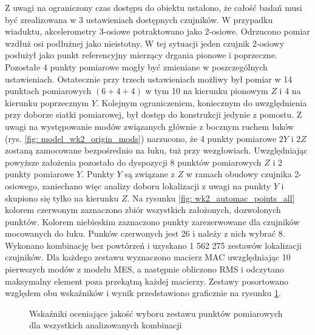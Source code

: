 Z uwagi na ograniczony czas dostępu do obiektu ustalono, że całość badań musi być zrealizowana w 3 ustawieniach dostępnych czujników. W przypadku wiaduktu, akcelerometry 3-osiowe potraktowano jako 2-osiowe. Odrzucono pomiar wzdłuż osi podłużnej jako nieistotny. W tej sytuacji jeden czujnik 2-osiowy posłużył jako punkt referencyjny mierzący drgania pionowe i poprzeczne. Pozostałe 4 punkty pomiarowe mogły być zmieniane w poszczególnych ustawieniach. Ostatecznie przy trzech ustawieniach możliwy był pomiar w 14 punktach pomiarowych $(6+4+4)$ w tym 10 na kierunku pionowym $Z$ i 4 na kierunku poprzecznym $Y$. Kolejnym ograniczeniem, koniecznym do uwzględnienia przy doborze siatki pomiarowej, był dostęp do konstrukcji jedynie z pomostu. Z uwagi na występowanie modów związanych głównie z bocznym ruchem łuków (rys. \ref{fig: model_wk2_origin_mods}) narzucono, że 4 punkty pomiarowe $2Y$ i $2Z$ zostaną zamocowane bezpośrednio na łuku, tuż przy wezgłowiach. Uwzględniając powyższe założenia pozostało do dyspozycji 8 punktów pomiarowych $Z$ i 2 punkty pomiarowe $Y$. Punkty $Y$ są związane z $Z$ w ramach obudowy czujnika 2-osiowego, zaniechano więc analizy doboru lokalizacji z uwagi na punkty $Y$ i skupiono się tylko na kierunku $Z$. Na rysunku \ref{fig: wk2_automac_points_all} kolorem czerwonym zaznaczono zbiór wszystkich założonych, dozwolonych punktów. Kolorem niebieskim zaznaczono punkty zarezerwowane dla czujników mocowanych do łuku. Punków czerwonych jest 26 i należy z nich wybrać 8. Wykonano kombinację bez powtórzeń i uzyskano 1 562 275 zestawów lokalizacji czujników. Dla każdego zestawu wyznaczono macierz MAC uwzględniając 10 pierwszych modów z modelu MES, a następnie obliczono RMS i odczytano maksymalny element poza przekątną każdej macierzy. Zestawy posortowano względem obu wskaźników i wynik przedstawiono graficznie na rysunku \ref{fig: wk2_automac_charts}. 
\begin{figure}[hbt!]
	\centering
	\captionsetup{justification=centering}
	\captionsetup{justification=centering}
	\caption{Wskaźniki oceniające jakość wyboru zestawu punktów pomiarowych dla wszystkich analizowanych kombinacji}
	\label{fig: wk2_automac_charts}
\end{figure}

